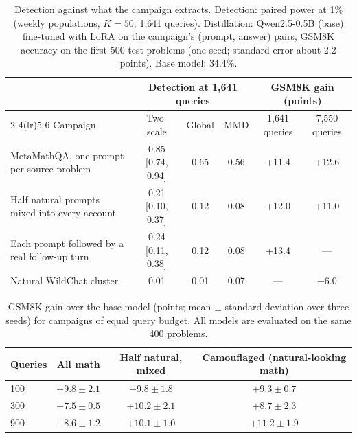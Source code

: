 \begin{table}[h]
\centering
\caption{Detection against what the campaign extracts. Detection: paired power at 1\% (weekly populations, $K=50$, 1{,}641 queries). Distillation: Qwen2.5-0.5B (base) fine-tuned with LoRA on the campaign's (prompt, answer) pairs, GSM8K accuracy on the first 500 test problems (one seed; standard error about 2.2 points). Base model: 34.4\%.}
\label{tabA:stealth}
\small
\setlength{\tabcolsep}{4pt}
\begin{tabular}{lccccc}
\toprule
& \multicolumn{3}{c}{Detection at 1{,}641 queries} & \multicolumn{2}{c}{GSM8K gain (points)} \\
\cmidrule(lr){2-4}\cmidrule(lr){5-6}
Campaign & Two-scale & Global & MMD & 1{,}641 queries & 7{,}550 queries \\
\midrule
MetaMathQA, one prompt per source problem & 0.85 [0.74, 0.94] & 0.65 & 0.56 & +11.4 & +12.6 \\
Half natural prompts mixed into every account & 0.21 [0.10, 0.37] & 0.12 & 0.08 & +12.0 & +11.0 \\
Each prompt followed by a real follow-up turn & 0.24 [0.11, 0.38] & 0.12 & 0.08 & +13.4 & --- \\
Natural WildChat cluster & 0.01 & 0.01 & 0.07 & --- & +6.0 \\
\bottomrule
\end{tabular}
\end{table}
\begin{table}[h]
\centering
\caption{GSM8K gain over the base model (points; mean $\pm$ standard deviation over three seeds) for campaigns of equal query budget. All models are evaluated on the same 400 problems.}
\label{tabA:stealth2}
\small
\begin{tabular}{lccc}
\toprule
Queries & All math & Half natural, mixed & Camouflaged (natural-looking math) \\
\midrule
100 & $+9.8\pm2.1$ & $+9.8\pm1.8$ & $+9.3\pm0.7$ \\
300 & $+7.5\pm0.5$ & $+10.2\pm2.1$ & $+8.7\pm2.3$ \\
900 & $+8.6\pm1.2$ & $+10.1\pm1.0$ & $+11.2\pm1.9$ \\
\bottomrule
\end{tabular}
\end{table}
